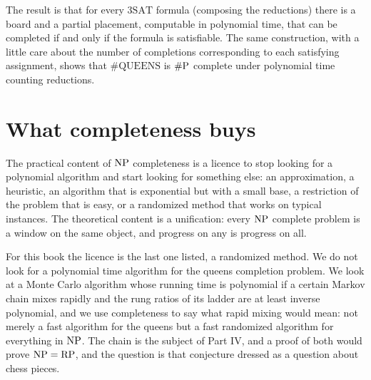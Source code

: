 The result is that for every $3\mathrm{SAT}$ formula (composing the reductions) there is a board and a partial placement, computable in polynomial time, that can be completed if and only if the formula is satisfiable. The same construction, with a little care about the number of completions corresponding to each satisfying assignment, shows that $\#\mathrm{QUEENS}$ is $\#\mathrm{P}$ complete under polynomial time counting reductions.

\section{What completeness buys}

The practical content of $\mathrm{NP}$ completeness is a licence to stop looking for a polynomial algorithm and start looking for something else: an approximation, a heuristic, an algorithm that is exponential but with a small base, a restriction of the problem that is easy, or a randomized method that works on typical instances. The theoretical content is a unification: every $\mathrm{NP}$ complete problem is a window on the same object, and progress on any is progress on all.

For this book the licence is the last one listed, a randomized method. We do not look for a polynomial time algorithm for the queens completion problem. We look at a Monte Carlo algorithm whose running time is polynomial if a certain Markov chain mixes rapidly and the rung ratios of its ladder are at least inverse polynomial, and we use completeness to say what rapid mixing would mean: not merely a fast algorithm for the queens but a fast randomized algorithm for everything in $\mathrm{NP}$. The chain is the subject of Part IV, and a proof of both would prove $\mathrm{NP} = \mathrm{RP}$, and the question is that conjecture dressed as a question about chess pieces.
